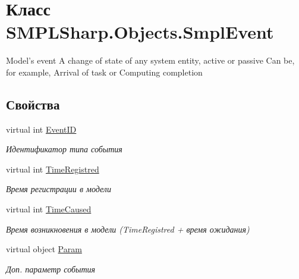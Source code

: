 \hypertarget{class_s_m_p_l_sharp_1_1_objects_1_1_smpl_event}{\section{Класс S\-M\-P\-L\-Sharp.\-Objects.\-Smpl\-Event}
\label{de/d57/class_s_m_p_l_sharp_1_1_objects_1_1_smpl_event}
}


Model's event A change of state of any system entity, active or passive Can be, for example, Arrival of task or Computing completion  


\subsection*{Свойства}
\begin{DoxyCompactItemize}
\item 
virtual int \hyperlink{class_s_m_p_l_sharp_1_1_objects_1_1_smpl_event_a7ee1edd67c31aef8cd818f899a393abe}{Event\-I\-D}
\begin{DoxyCompactList}\small\item\em Идентификатор типа события \end{DoxyCompactList}\item 
virtual int \hyperlink{class_s_m_p_l_sharp_1_1_objects_1_1_smpl_event_a5d72178bd46b26372514d711c05a3ea2}{Time\-Registred}
\begin{DoxyCompactList}\small\item\em Время регистрации в модели \end{DoxyCompactList}\item 
virtual int \hyperlink{class_s_m_p_l_sharp_1_1_objects_1_1_smpl_event_ad5ad0f4179e5d77831cc82d0a8bf5b29}{Time\-Caused}
\begin{DoxyCompactList}\small\item\em Время возникновения в модели (Time\-Registred + время ожидания) \end{DoxyCompactList}\item 
virtual object \hyperlink{class_s_m_p_l_sharp_1_1_objects_1_1_smpl_event_ae4cc80e480603021bc0d0d0e1ea2c666}{Param}
\begin{DoxyCompactList}\small\item\em Доп. параметр события \end{DoxyCompactList}\end{DoxyCompactItemize}


